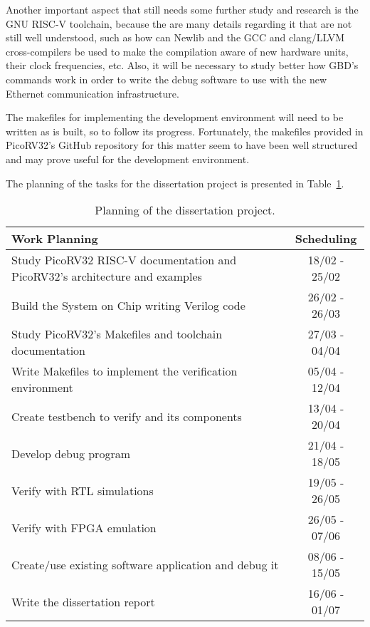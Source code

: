 Another important aspect that still needs some further study and research is the
GNU RISC-V toolchain, because the are many details regarding it that are not
still well understood, such as how can Newlib and the GCC and clang/LLVM
cross-compilers be used to make the compilation aware of new hardware units,
their clock frequencies, etc. Also, it will be necessary to study better how
GBD's commands work in order to write the debug software to use with the new
Ethernet communication infrastructure.

The makefiles for implementing the development environment will need to be
written as \socname is built, so to follow its progress. Fortunately, the
makefiles provided in PicoRV32's GitHub repository for this matter seem to have
been well structured and may prove useful for the development environment.

The planning of the tasks for the dissertation project is presented in
Table~\ref{table:planning}.
\begin{table}[!htbp]
	\centering
	\caption{Planning of the dissertation project.}
	\label{table:planning}
	\begin{tabular}{p{11cm}c}
		\toprule
		\textbf{Work Planning}                                                                            & \textbf{Scheduling} \\
		\midrule
		Study PicoRV32 RISC-V documentation and PicoRV32's architecture and examples                      & 18/02 - 25/02       \\
		\midrule
		Build the \socname System on Chip writing Verilog code                                            & 26/02 - 26/03       \\
		\midrule
		Study PicoRV32's Makefiles and toolchain documentation                                            & 27/03 - 04/04       \\
		\midrule
		Write Makefiles to implement the verification environment                                         & 05/04 - 12/04       \\
		\midrule
		Create testbench to verify \socname and its components                                            & 13/04 - 20/04       \\
		\midrule
		Develop debug program                                                                             & 21/04 - 18/05       \\
		\midrule
		Verify \socname with RTL simulations                                                              & 19/05 - 26/05       \\
		\midrule
		Verify \socname with FPGA emulation                                                               & 26/05 - 07/06       \\
		\midrule
		Create/use existing software application and debug it                                             & 08/06 - 15/05       \\
		\midrule
		Write the dissertation report                                                                     & 16/06 - 01/07       \\
		\bottomrule 
	\end{tabular}
\end{table}

